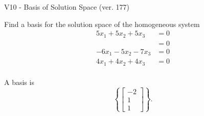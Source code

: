 \begin{exercise}
  \begin{exerciseTitle}V10 - Basis of Solution Space (ver. 177)\end{exerciseTitle}
  \begin{exerciseStatement}
    Find a basis for the solution space of the homogeneous system 
\begin{align*}
 5 x_ 1 + 5 x_ 2 + 5 x_ 3 &= 0  \\ 
  &= 0  \\ 
  -6 x_ 1 -5 x_ 2 -7 x_ 3 &= 0  \\ 
  4 x_ 1 + 4 x_ 2 + 4 x_ 3 &= 0  \\ 
 \end{align*}


 
  \end{exerciseStatement}

  \begin{exerciseAnswer}
   A basis is   
\[\left\{\left[\begin{array}{c}
-2 \\
1 \\
1
\end{array}\right]\right\}.\]

  


  \end{exerciseAnswer}
\end{exercise}